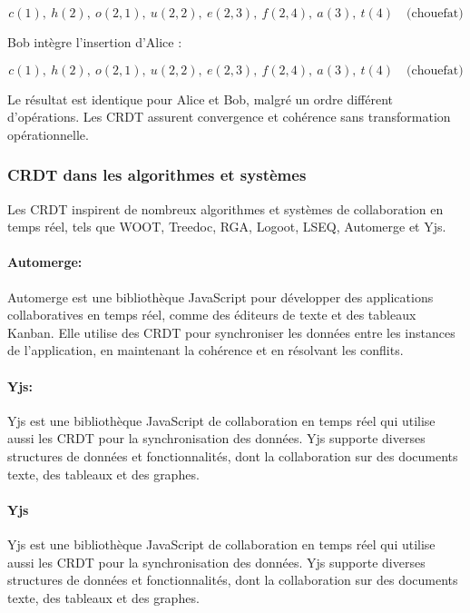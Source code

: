 \begin{equation}
    c(1), \ h(2), \ o(2, 1), \ u(2, 2), \ e(2, 3), \ f(2, 4), \ a(3), \ t(4) \quad \text{(chouefat)}
\end{equation}

Bob intègre l'insertion d'Alice :

\begin{equation}
    c(1), \ h(2), \ o(2, 1), \ u(2, 2), \ e(2, 3), \ f(2, 4), \ a(3), \ t(4) \quad \text{(chouefat)}
\end{equation}

Le résultat est identique pour Alice et Bob, malgré un ordre différent d'opérations. Les CRDT assurent convergence et cohérence sans transformation opérationnelle.
\subsubsection{CRDT dans les algorithmes et systèmes}

Les CRDT inspirent de nombreux algorithmes et systèmes de collaboration en temps réel, tels que WOOT, Treedoc, RGA, Logoot, LSEQ, Automerge et Yjs.

\paragraph{Automerge\cite{hardenbergAutomerge2023}: } Automerge est une bibliothèque JavaScript pour développer des applications collaboratives en temps réel, comme des éditeurs de texte et des tableaux Kanban. Elle utilise des CRDT pour synchroniser les données entre les instances de l'application, en maintenant la cohérence et en résolvant les conflits.

\paragraph{Yjs\cite{nicolaescuYjsFrameworkRealTime2015}: } Yjs est une bibliothèque JavaScript de collaboration en temps réel qui utilise aussi les CRDT pour la synchronisation des données. Yjs supporte diverses structures de données et fonctionnalités, dont la collaboration sur des documents texte, des tableaux et des graphes.

\paragraph{Yjs}

Yjs est une bibliothèque JavaScript de collaboration en temps réel qui utilise aussi les CRDT pour la synchronisation des données. Yjs supporte diverses structures de données et fonctionnalités, dont la collaboration sur des documents texte, des tableaux et des graphes.

